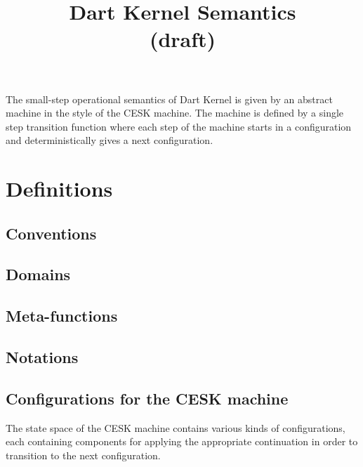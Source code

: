 \documentclass{article}
\begin{document}
\title{Dart Kernel Semantics \\ (draft)}

\maketitle

The small-step operational semantics of Dart Kernel is given by an abstract machine in the style of the CESK machine. The machine is defined by a single step transition function where each step of the machine starts in a configuration and deterministically gives a next configuration.

\section{Definitions}
\subsection{Conventions}
\subsection{Domains}
\subsection{Meta-functions}
\subsection{Notations}
\subsection{Configurations for the CESK machine}
The state space of the CESK machine contains various kinds of configurations, each containing components for applying the appropriate continuation in order to transition to the next configuration. 
\end{document}
